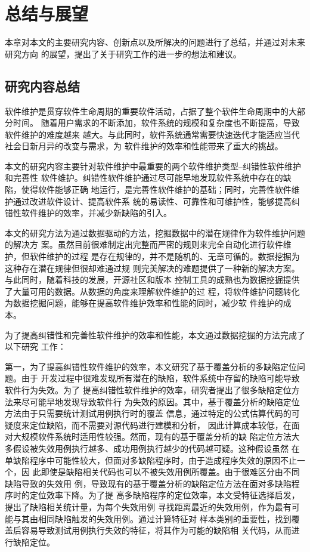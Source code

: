 \chapter{总结与展望}
本章对本文的主要研究内容、创新点以及所解决的问题进行了总结，并通过对未来研究方向
的展望，提出了关于研究工作的进一步的想法和建议。

\section{研究内容总结}
软件维护是贯穿软件生命周期的重要软件活动，占据了整个软件生命周期中的大部分时间。
随着用户需求的不断添加，软件系统的规模和复杂度也不断提高，导致软件维护的难度越来
越大。与此同时，软件系统通常需要快速迭代才能适应当代社会日新月异的改变与需求，为
软件维护的效率和性能带来了重大的挑战。

本文的研究内容主要针对软件维护中最重要的两个软件维护类型--纠错性软件维护和完善性
软件维护。纠错性软件维护通过尽可能早地发现软件系统中存在的缺陷，使得软件能够正确
地运行，是完善性软件维护的基础；同时，完善性软件维护通过改进软件设计、提高软件系
统的易读性、可靠性和可维护性，能够提高纠错性软件维护的效率，并减少新缺陷的引入。

本文的研究方法为通过数据驱动的方法，挖掘数据中的潜在规律作为软件维护问题的解决方
案。虽然目前很难制定出完整而严密的规则来完全自动化进行软件维护，但软件维护的过程
是存在规律的，并不是随机的、无章可循的。数据挖掘为这种存在潜在规律但很却难通过规
则完美解决的难题提供了一种新的解决方案。与此同时，随着科技的发展，开源社区和版本
控制工具的成熟也为数据挖掘提供了大量可用的数据。从数据的角度来理解软件维护的过
程，将软件维护问题转化为数据挖掘问题，能够在提高软件维护效率和性能的同时，减少软
件维护的成本。

为了提高纠错性和完善性软件维护的效率和性能，本文通过数据挖掘的方法完成了以下研究
工作：

第一，为了提高纠错性软件维护的效率，本文研究了基于覆盖分析的多缺陷定位问题。由于
开发过程中很难发现所有潜在的缺陷，软件系统中存留的缺陷可能导致软件行为失效。为了
提高纠错性软件维护的效率，研究者提出了很多缺陷定位方法来尽可能早地发现导致软件行
为失效的原因。其中，基于覆盖分析的缺陷定位方法由于只需要统计测试用例执行时的覆盖
信息，通过特定的公式估算代码的可疑度来定位缺陷，而不需要对源代码进行建模和分析，
因此计算成本较低，在面对大规模软件系统时适用性较强。然而，现有的基于覆盖分析的缺
陷定位方法大多假设被失效用例执行越多、成功用例执行越少的代码越可疑。这种假设虽然
在单缺陷程序中可能性较大，但面对多缺陷程序时，由于造成程序失效的原因不止一个，因
此即使是缺陷相关代码也可以不被失效用例所覆盖。由于很难区分由不同缺陷导致的失效用
例，导致现有的基于覆盖分析的缺陷定位方法在面对多缺陷程序时的定位效率下降。为了提
高多缺陷程序的定位效率，本文受特征选择启发，提出了缺陷相关统计量，为每个失效用例
寻找距离最近的失效用例，作为最有可能与其由相同缺陷触发的失效用例。通过计算特征对
样本类别的重要性，找到覆盖后容易导致测试用例执行失效的特征，将其作为可能的缺陷相
关代码，从而进行缺陷定位。


